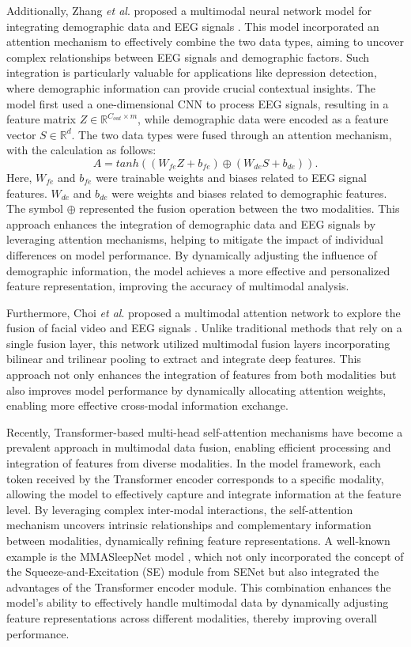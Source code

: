 \documentclass[preprint,12pt]{elsarticle}
\newcommand{\etal}{\textit{et al}. }
\begin{document}
Additionally, Zhang \etal proposed a multimodal neural network model for integrating demographic data and EEG signals \cite{zhang2020eeg}. This model incorporated an attention mechanism to effectively combine the two data types, aiming to uncover complex relationships between EEG signals and demographic factors. Such integration is particularly valuable for applications like depression detection, where demographic information can provide crucial contextual insights. The model first used a one-dimensional CNN to process EEG signals, resulting in a feature matrix $Z \in \mathbb{R}^{C_{out} \times m}$, while demographic data were encoded as a feature vector $S \in \mathbb{R}^d$. The two data types were fused through an attention mechanism, with the calculation as follows:
\begin{equation}
     A = tanh((W_{fe}Z+b_{fe})\oplus(W_{de}S+b_{de})).
\end{equation}
Here, $W_{fe}$ and $b_{fe}$ were trainable weights and biases related to EEG signal features. $W_{de}$ and $b_{de}$ were weights and biases related to demographic features. The symbol $\oplus$ represented the fusion operation between the two modalities. This approach enhances the integration of demographic data and EEG signals by leveraging attention mechanisms, helping to mitigate the impact of individual differences on model performance. By dynamically adjusting the influence of demographic information, the model achieves a more effective and personalized feature representation, improving the accuracy of multimodal analysis.

Furthermore, Choi \etal proposed a multimodal attention network to explore the fusion of facial video and EEG signals \cite{choi2020multimodal}. Unlike traditional methods that rely on a single fusion layer, this network utilized multimodal fusion layers incorporating bilinear and trilinear pooling to extract and integrate deep features. This approach not only enhances the integration of features from both modalities but also improves model performance by dynamically allocating attention weights, enabling more effective cross-modal information exchange.

Recently, Transformer-based multi-head self-attention mechanisms have become a prevalent approach in multimodal data fusion, enabling efficient processing and integration of features from diverse modalities. In the model framework, each token received by the Transformer encoder corresponds to a specific modality, allowing the model to effectively capture and integrate information at the feature level. By leveraging complex inter-modal interactions, the self-attention mechanism uncovers intrinsic relationships and complementary information between modalities, dynamically refining feature representations. A well-known example is the MMASleepNet model \cite{yubo2022mmasleepnet}, which not only incorporated the concept of the Squeeze-and-Excitation (SE) module from SENet \cite{hu2018squeeze} but also integrated the advantages of the Transformer encoder module. This combination enhances the model’s ability to effectively handle multimodal data by dynamically adjusting feature representations across different modalities, thereby improving overall performance.
\end{document}
